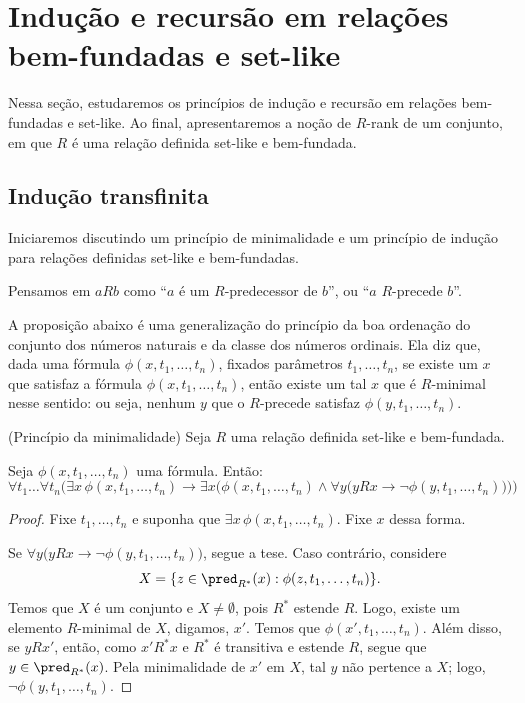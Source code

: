 
\section{Indução e recursão em relações bem-fundadas e set-like}
Nessa seção, estudaremos os princípios de indução e recursão em relações bem-fundadas e set-like.
Ao final, apresentaremos a noção de $R$-rank de um conjunto, em que $R$ é uma relação definida set-like e bem-fundada.

\subsection{Indução transfinita}

Iniciaremos discutindo um princípio de minimalidade e um princípio de indução para relações definidas set-like e bem-fundadas.

Pensamos em $a R b$ como ``$a$ é um $R$-predecessor de $b$'', ou ``$a$ $R$-precede $b$''.

A proposição abaixo é uma generalização do princípio da boa ordenação do conjunto dos números naturais e da classe dos números ordinais.
Ela diz que, dada uma fórmula $\phi(x, t_1, \dots, t_n)$, fixados parâmetros $t_1, \dots, t_n$, se existe um $x$ que satisfaz a fórmula $\phi(x, t_1, \dots, t_n)$, então existe um tal $x$ que é $R$-minimal nesse sentido: ou seja, nenhum $y$ que o $R$-precede satisfaz $\phi(y, t_1, \dots, t_n)$.

\begin{proposition}[$\ZFmP$](Princípio da minimalidade)\label{prop:principioDaMinimalidade}
    Seja $R$ uma relação definida set-like e bem-fundada.
    
    Seja $\phi(x, t_1, \dots, t_n)$ uma fórmula.
    Então:
    \[
        \forall t_1\dots \forall t_n\bigg(\exists x \, \phi(x, t_1, \dots, t_n) \rightarrow \exists x\bigg(\phi(x, t_1, \dots, t_n)\wedge \forall y\big(y R x \rightarrow \neg \phi(y, t_1, \dots, t_n)\big)\bigg)\bigg)
    \]
\end{proposition}

\begin{proof}
    Fixe $t_1, \dots, t_n$ e suponha que $\exists x\, \phi(x, t_1, \dots, t_n)$.
    Fixe $x$ dessa forma.

    Se $\forall y\big(y R x \rightarrow \neg \phi(y, t_1, \dots, t_n)\big)$, segue a tese.
    Caso contrário, considere
    \[
        X=\{z \in \pred_{R^*}(x): \phi(z, t_1, \dots, t_n)\}.
    \]
    Temos que $X$ é um conjunto e $X\neq \emptyset$, pois $R^*$ estende $R$.
    Logo, existe um elemento $R$-minimal de $X$, digamos, $x'$.
    Temos que $\phi(x', t_1, \dots, t_n)$.
    Além disso, se $y R x'$, então, como $x' R^* x$ e $R^*$ é transitiva e estende $R$, segue que $y\in \pred_{R^*}(x)$.
    Pela minimalidade de $x'$ em $X$, tal $y$ não pertence a $X$; logo, $\neg \phi(y, t_1, \dots, t_n)$.
\end{proof}

